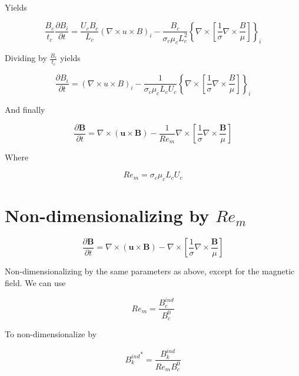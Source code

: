 \documentclass[11pt]{article}
\begin{document}
Yields

\begin{equation}
	\frac{B_c}{t_c} 
	\frac{\partial B_i}{\partial t} 
	= 
	\frac{U_c B_c}{L_c}
	(\nabla \times u \times B)_i
	- 
	\frac{B_c}{\sigma_c \mu_c L_c^2}
	\left\{
	\nabla \times 
	\left[ \frac{1}{\sigma}
	\nabla \times \frac{B}{\mu} \right]
	\right\}_i
\end{equation}

Dividing by $\frac{B_c}{t_c}$ yields

\begin{equation}
	\frac{\partial B_i}{\partial t} 
	= 
	(\nabla \times u \times B)_i
	- 
	\frac{1}{\sigma_c \mu_c L_c U_c}
	\left\{
	\nabla \times 
	\left[ \frac{1}{\sigma}
	\nabla \times \frac{B}{\mu} \right]
	\right\}_i
\end{equation}

And finally

\begin{equation}
	\boxed{
	\frac{\partial \pmb{B}}{\partial t} = 
	\nabla \times (\pmb{u} \times \pmb{B})
	- 
	\frac{1}{Re_m}
	\nabla \times 
	\left[ \frac{1}{\sigma}
	\nabla \times \frac{\pmb{B}}{\mu} \right]
	}
\end{equation}

Where

\begin{equation}
	Re_m = \sigma_c \mu_c L_c U_c
\end{equation}


\section{Non-dimensionalizing by \texorpdfstring{$Re_m$}{LG}}

\begin{equation}
	\frac{\partial \pmb{B}}{\partial t} = 
	\nabla \times (\pmb{u} \times \pmb{B})
	- \nabla \times 
	\left[ \frac{1}{\sigma}
	\nabla \times \frac{\pmb{B}}{\mu} \right]
\end{equation}

Non-dimensionalizing by the same parameters as above, except for the magnetic field. We can use


\begin{equation}
	Re_m = \frac{B_c^{ind}}{B_c^{0}}
\end{equation}

To non-dimensionalize by

\begin{equation*}
	{B_k^{ind}}^* = \frac{B_k^{ind}}{Re_m B_c^{0}}
\end{equation*}
\end{document}
